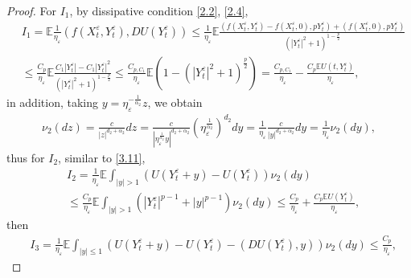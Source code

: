 \documentclass[11pt,reqno]{amsart}
\numberwithin{equation}{section}
\begin{document}
\begin{proof}
	For $I_{1}$, by   dissipative condition \eqref{2.2}, \eqref{2.4}, 
	\begin{equation}\label{3.16}
		\begin{split}
			&I_{1}=\mathbb{E} \frac{1}{\eta_{\varepsilon}}( f(X_{t}^{\varepsilon},Y_{t}^{\varepsilon}),DU(Y_{t}^{\varepsilon})) \leq\frac{1}{\eta_{\varepsilon}} \mathbb{E}  \frac{( f(X_{t}^{\varepsilon},Y_{t}^{\varepsilon})-f(X_{t}^{\varepsilon},0),pY_{t}^{\varepsilon}) +( f(X_{t}^{\varepsilon},0),pY_{t}^{\varepsilon})}{(|Y_{t}^{\varepsilon}|^{2}+1)^{1-\frac{p}{2}}}\\
			&\leq  \frac{C_{p}}{\eta_{\varepsilon}}\mathbb{E} \frac{C_{1}|Y_{t}^{\varepsilon}|-C_{1}|Y_{t}^{\varepsilon}|^{2}}{(|Y_{t}^{\varepsilon}|^{2}+1)^{1-\frac{p}{2}}}\leq \frac{C_{p,C_{1}}}{\eta_{\varepsilon}}\mathbb{E}\left( 1-(|Y_{t}^{\varepsilon}|^{2}+1)^{\frac{p}{2}}\right)=\frac{C_{p,C_{1}}}{\eta_{\varepsilon}}-\frac{C_{p}\mathbb{E}U(t,Y_{t}^{\varepsilon})}{\eta_{\varepsilon}},  
		\end{split}
	\end{equation}
	in addition, taking $y=\eta_{\varepsilon}^{-\frac{1}{\alpha_{2}}}z$,  we obtain 
	\begin{equation}\label{3.17-1}
	\begin{split}\nu_{2}(dz)=\frac{c}{|z|^{d_2+\alpha_{2}}}dz=\frac{c}{|\eta_{\varepsilon}^{\frac{1}{\alpha_{2}}}y|^{d_2+\alpha_{2}}}(\eta_{\varepsilon}^{\frac{1}{\alpha_{2}}})^{d_2}dy=\frac{1}{\eta_{\varepsilon}}\frac{c}{|y|^{d_2+\alpha_{2}}}dy=\frac{1}{\eta_{\varepsilon}}\nu_{2}(dy),		
	\end{split}
	\end{equation}
	thus for $I_{2}$, similar to \eqref{3.11},
	\begin{equation}\label{3.17}
		\begin{split}
			&I_{2}=\frac{1}{\eta_{\varepsilon}}\mathbb{E} \int_{|y|> 1}\left( U(Y_{t}^{\varepsilon}+y)-U(Y_{t}^{\varepsilon}) \right) \nu_{2}(dy) \\
			&\leq  \frac{C_{p}}{\eta_{\varepsilon}}\mathbb{E}\int_{|y|> 1}\left(|Y_{t}^{\varepsilon}|^{p-1}+|y|^{p-1} \right) \nu_{2}(dy) \leq\frac{C_{p}}{\eta_{\varepsilon}}+\frac{C_{p}\mathbb{E}U(Y_{t}^{\varepsilon})}{\eta_{\varepsilon}},  
		\end{split}
	\end{equation}
	then 
	\begin{equation}\label{3.18}
		\begin{split}
			&I_{3}=\frac{1}{\eta_{\varepsilon}}\mathbb{E} \int_{|y|\leq 1}\left( U(Y_{t}^{\varepsilon}+y)-U(Y_{t}^{\varepsilon})-( DU(Y_{t}^{\varepsilon}),y) \right) \nu_{2}(dy)\leq  \frac{C_{p}}{\eta_{\varepsilon}},  

\end{split}
\end{equation}
\end{proof}
\end{document}
